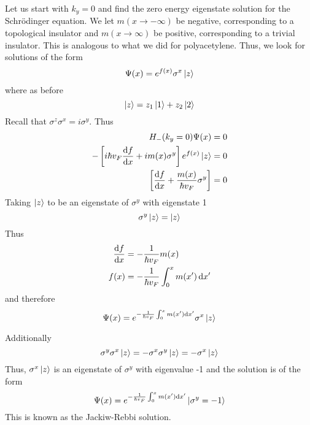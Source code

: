 \documentclass[12pt,a4paper,titlepage]{article}
\begin{document}
Let us start with $k_{y}=0$ and find the zero energy eigenstate solution for the Schr\"{o}dinger equation. We let $m(x\rightarrow-\infty)$ be negative, corresponding to a topological insulator and $m(x\rightarrow\infty)$ be positive, corresponding to a trivial insulator. This is analogous to what we did for polyacetylene. Thus, we look for solutions of the form
\begin{equation}
\Psi(x)=e^{f(x)}\sigma^{x}\ket{z}
\end{equation}
where as before
\begin{equation}
\ket{z}=z_{1}\ket{1}+z_{2}\ket{2}
\end{equation}
Recall that $\sigma^{z}\sigma^{x}=i\sigma^{y}$. Thus
\begin{equation}
\begin{aligned}
H_{-}(k_{y}=0)\Psi(x)&=0\\
-\left[i\hbar v_{F}\dv{f}{x}+im(x)\sigma^{y}\right]e^{f(x)}\ket{z}&=0\\
\left[\dv{f}{x}+\frac{m(x)}{\hbar v_{F}}\sigma^{y}\right]&=0
\end{aligned}
\end{equation}
Taking $\ket{z}$ to be an eigenstate of $\sigma^{y}$ with eigenstate 1
\begin{equation}
\sigma^{y}\ket{z}=\ket{z}
\end{equation}
Thus
\begin{equation}
\begin{aligned}
\dv{f}{x}&=-\frac{1}{\hbar v_{F}}m(x)\\
f(x)&=-\frac{1}{\hbar v_{F}}\int_{0}^{x}m(x')\dd{x'}
\end{aligned}
\end{equation}
and therefore
\begin{equation}
\Psi(x)=e^{-\frac{1}{\hbar v_{F}}\int_{0}^{x}m(x')\dd{x'}}\sigma^{x}\ket{z}
\end{equation}

\begin{center}
\end{center}

Additionally
\begin{equation}
\sigma^{y}\sigma^{x}\ket{z}=-\sigma^{x}\sigma^{y}\ket{z}=-\sigma^{x}\ket{z}
\end{equation}
Thus, $\sigma^{x}\ket{z}$ is an eigenstate of $\sigma^{y}$ with eigenvalue -1 and the solution is of the form
\begin{equation}
\Psi(x)=e^{-\frac{1}{\hbar v_{F}}\int_{0}^{x}m(x')\dd{x'}}\ket{\sigma^{y}=-1}
\end{equation}
This is known as the Jackiw-Rebbi solution.\\
\end{document}
